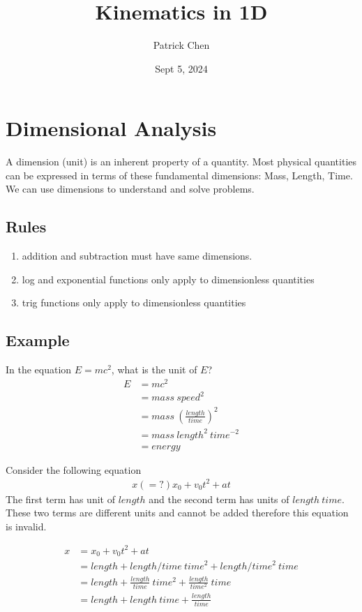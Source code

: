 \documentclass{article}
\title{Kinematics in 1D}
\author{Patrick Chen}
\date{Sept 5, 2024}
\theoremstyle{mytheoremstyle}
\theoremstyle{mytheoremstyle}
\theoremstyle{myproblemstyle}
\begin{document}
    \maketitle
    \section*{Dimensional Analysis}
    A dimension (unit) is an inherent property of a quantity. Most physical
    quantities can be expressed in terms of these fundamental dimensions: Mass,
    Length, Time. We can use dimensions to understand and solve problems.

    \subsection*{Rules}
    \begin{enumerate}
        \item addition and subtraction must have same dimensions.

        \item  log and exponential functions only apply to dimensionless quantities

        \item trig functions only apply to dimensionless quantities
    \end{enumerate}

    \subsection*{Example}
    In the equation $E=mc^2$, what is the unit of $E$?
    \begin{align*}
        E& =mc^2 \\
         & = mass\ speed^2 \\
         & = mass\ (\frac{length}{time})^2 \\
         & = mass\ length^2\ time^{-2} \\
         & = energy
    \end{align*}

    Consider the following equation
    \begin{align*}
        x(=?)x_0+v_0t^2+at
    \end{align*}
    The first term has unit of $length$ and the second term has units of
    $length\ time$. These two terms are different units and cannot be added
    therefore this equation is invalid.

    \begin{align*}
        x&=x_0+v_0t^2+at \\
        &= length + length/time \ time^2 + length/time^2\ time \\
        &= length + \frac{length}{time} \ time^2 + \frac{length}{time^2}\ time \\
        &= length + length\ time + \frac{length}{time}
    \end{align*}
\end{document}
